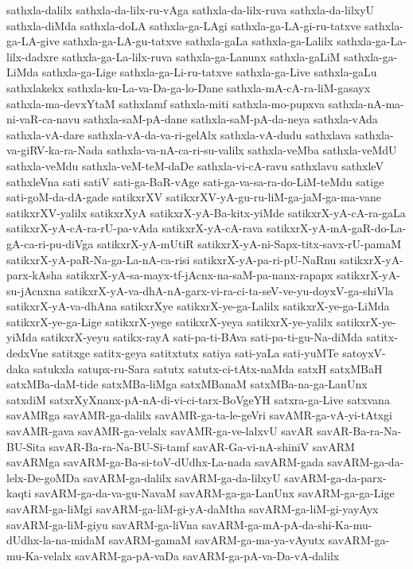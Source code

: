 {sathxla-dalilx
sathxla-da-lilx-ru-vAga
sathxla-da-lilx-ruva
sathxla-da-lilxyU
sathxla-diMda
sathxla-doLA
sathxla-ga-LAgi
sathxla-ga-LA-gi-ru-tatxve
sathxla-ga-LA-give
sathxla-ga-LA-gu-tatxve
sathxla-gaLa
sathxla-ga-Lalilx
sathxla-ga-La-lilx-dadxre
sathxla-ga-La-lilx-ruva
sathxla-ga-Lanunx
sathxla-gaLiM
sathxla-ga-LiMda
sathxla-ga-Lige
sathxla-ga-Li-ru-tatxve
sathxla-ga-Live
sathxla-gaLu
sathxlakekx
sathxla-ku-La-va-Da-ga-lo-Dane
sathxla-mA-cA-ra-liM-gasayx
sathxla-ma-devxYtaM
sathxlamf
sathxla-miti
sathxla-mo-pupxva
sathxla-nA-ma-ni-vaR-ca-navu
sathxla-saM-pA-dane
sathxla-saM-pA-da-neya
sathxla-vAda
sathxla-vA-dare
sathxla-vA-da-va-ri-gelAlx
sathxla-vA-dudu
sathxlava
sathxla-va-giRV-ka-ra-Nada
sathxla-va-nA-ca-ri-su-valilx
sathxla-veMba
sathxla-veMdU
sathxla-veMdu
sathxla-veM-teM-daDe
sathxla-vi-cA-ravu
sathxlavu
sathxleV
sathxleVna
sati
satiV
sati-ga-BaR-vAge
sati-ga-va-sa-ra-do-LiM-teMdu
satige
sati-goM-da-dA-gade
satikxrXV
satikxrXV-yA-gu-ru-liM-ga-jaM-ga-ma-vane
satikxrXV-yalilx
satikxrXyA
satikxrX-yA-Ba-kitx-yiMde
satikxrX-yA-cA-ra-gaLa
satikxrX-yA-cA-ra-rU-pa-vAda
satikxrX-yA-cA-rava
satikxrX-yA-mA-gaR-do-La-gA-ca-ri-pu-diVga
satikxrX-yA-mUtiR
satikxrX-yA-ni-Sapx-titx-savx-rU-pamaM
satikxrX-yA-paR-Na-ga-La-nA-ca-risi
satikxrX-yA-pa-ri-pU-NaRnu
satikxrX-yA-parx-kAsha
satikxrX-yA-sa-mayx-tf-jAcnx-na-saM-pa-nanx-rapapx
satikxrX-yA-su-jAcnxna
satikxrX-yA-va-dhA-nA-garx-vi-ra-ci-ta-seV-ve-yu-doyxV-ga-shiVla
satikxrX-yA-va-dhAna
satikxrXye
satikxrX-ye-ga-Lalilx
satikxrX-ye-ga-LiMda
satikxrX-ye-ga-Lige
satikxrX-yege
satikxrX-yeya
satikxrX-ye-yalilx
satikxrX-ye-yiMda
satikxrX-yeyu
satikx-rayA
sati-pa-ti-BAva
sati-pa-ti-gu-Na-diMda
satitx-dedxVne
satitxge
satitx-geya
satitxtutx
satiya
sati-yaLa
sati-yuMTe
satoyxV-daka
satukxla
satupx-ru-Sara
satutx
satutx-ci-tAtx-naMda
satxH
satxMBaH
satxMBa-daM-tide
satxMBa-liMga
satxMBanaM
satxMBa-na-ga-LanUnx
satxdiM
satxrXyXnanx-pA-nA-di-vi-ci-tarx-BoVgeYH
satxra-ga-Live
satxvana
savAMRga
savAMR-ga-dalilx
savAMR-ga-ta-le-geVri
savAMR-ga-vA-yi-tAtxgi
savAMR-gava
savAMR-ga-velalx
savAMR-ga-ve-lalxvU
savAR
savAR-Ba-ra-Na-BU-Sita
savAR-Ba-ra-Na-BU-Si-tamf
savAR-Ga-vi-nA-shiniV
savARM
savARMga
savARM-ga-Ba-si-toV-dUdhx-La-nada
savARM-gada
savARM-ga-da-lelx-De-goMDa
savARM-ga-dalilx
savARM-ga-da-lilxyU
savARM-ga-da-parx-kaqti
savARM-ga-da-va-gu-NavaM
savARM-ga-ga-LanUnx
savARM-ga-ga-Lige
savARM-ga-liMgi
savARM-ga-liM-gi-yA-daMtha
savARM-ga-liM-gi-yayAyx
savARM-ga-liM-giyu
savARM-ga-liVna
savARM-ga-mA-pA-da-shi-Ka-mu-dUdhx-la-na-midaM
savARM-gamaM
savARM-ga-ma-ya-vAyutx
savARM-ga-mu-Ka-velalx
savARM-ga-pA-vaDa
savARM-ga-pA-va-Da-vA-dalilx
}
